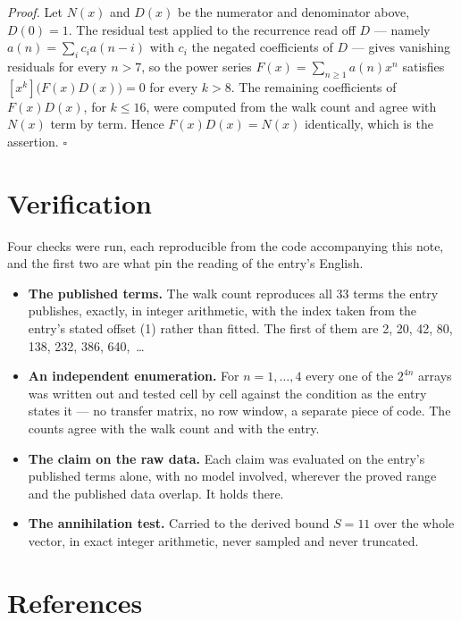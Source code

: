\documentclass[11pt]{article}
\theoremstyle{definition}
\begin{document}
{\itshape Proof.} Let $N(x)$ and $D(x)$ be the numerator and denominator above, $D(0)=1$. The residual test applied to the recurrence read off $D$ --- namely $a(n) = \sum_i c_i a(n-i)$ with $c_i$ the negated coefficients of $D$ --- gives vanishing residuals for every $n > 7$, so the power series $F(x)=\sum_{n\ge 1}a(n)x^n$ satisfies $[x^k]\bigl(F(x)D(x)\bigr) = 0$ for every $k > 8$. The remaining coefficients of $F(x)D(x)$, for $k \le 16$, were computed from the walk count and agree with $N(x)$ term by term. Hence $F(x)D(x) = N(x)$ identically, which is the assertion. $\square$

\section{Verification}

Four checks were run, each reproducible from the code accompanying this note, and the first two are what pin the reading of the entry's English.

\begin{itemize}

\item {\bfseries The published terms.} The walk count reproduces all 33 terms the entry publishes, exactly, in integer arithmetic, with the index taken from the entry's stated offset (1) rather than fitted. The first of them are 2, 20, 42, 80, 138, 232, 386, 640,~\dots

\item {\bfseries An independent enumeration.} For $n = 1,\dots,4$ every one of the $2^{4n}$ arrays was written out and tested cell by cell against the condition as the entry states it --- no transfer matrix, no row window, a separate piece of code. The counts agree with the walk count and with the entry.

\item {\bfseries The claim on the raw data.} Each claim was evaluated on the entry's published terms alone, with no model involved, wherever the proved range and the published data overlap. It holds there.

\item {\bfseries The annihilation test.} Carried to the derived bound $S = 11$ over the whole vector, in exact integer arithmetic, never sampled and never truncated.

\end{itemize}

\section{References}
\end{document}
